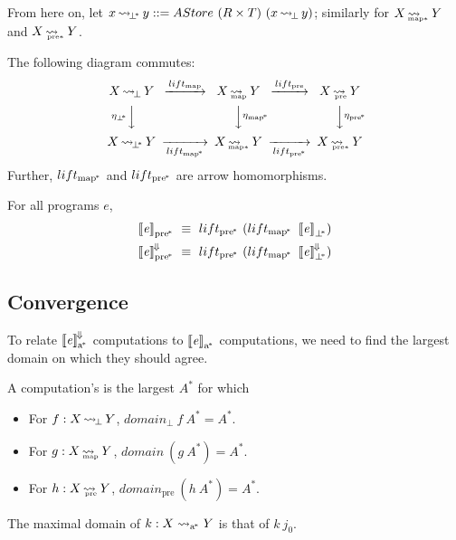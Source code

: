 \documentclass[preprint]{sigplanconf}
\newcommand{\arrow}{\rightsquigarrow}
\newcommand{\conv}{^{\mspace{-2mu}\Downarrow\mspace{-2mu}}}
\newcommand{\meaningofconv}[1]{\left\llbracket{#1}\right\rrbracket\conv}
\newcommand{\arrowlift}{\ensuremath{lift}}
\newcommand{\genc}{_\mathrm{a^{\mspace{-2mu}*}}}
\DeclareMathOperator{\botto}{\arrow_{\mspace{-3mu}\bot}}
\newcommand{\map}{_\mathrm{map}}
\DeclareMathOperator{\mapto}{\arrow_{\mspace{-21mu}\map}}
\newcommand{\liftmap}{\arrowlift\map}
\newcommand{\pre}{_\mathrm{pre}}
\DeclareMathOperator{\preto}{\arrow_{\mspace{-19mu}\pre}}
\newcommand{\liftpre}{\arrowlift\pre}
\newcommand{\pbot}{{\bot^{\mspace{-4mu}*}}}
\DeclareMathOperator{\pbotto}{\arrow_{\mspace{-3mu}\pbot}}
\newcommand{\pmap}{_\mathrm{map^{\mspace{-2mu}*}}}
\DeclareMathOperator{\pmapto}{\arrow_{\mspace{-22mu}_{\mathrm{map*}}}}
\newcommand{\liftpmap}{\arrowlift\pmap}
\newcommand{\ppre}{_\mathrm{pre^{\mspace{-2mu}*}}}
\DeclareMathOperator{\ppreto}{\arrow_{\mspace{-19mu}_{\mathrm{pre*}}}}
\newcommand{\liftppre}{\arrowlift\ppre}
\begin{document}
From here on, let $x \pbotto y ::= AStore~(R \times T)~(x \botto y)$; similarly for $X \pmapto Y$ and $X \ppreto Y$.

\begin{corollary}
The following diagram commutes:
\begin{equation}
\begin{CD}
X \botto Y   @>\liftmap>>   X \mapto Y   @>\liftpre>>   X \preto Y \\
@V{\eta_\pbot}VV             @VV{\eta\pmap}V              @VV{\eta\ppre}V\\
X \pbotto Y  @>>\liftpmap>  X \pmapto Y  @>>\liftppre>  X \ppreto Y
\end{CD}
\end{equation}
Further, $\liftpmap$ and $\liftppre$ are arrow homomorphisms.
\end{corollary}

\begin{corollary}
For all programs $\mathit{e}$,
\begin{equation}
\begin{aligned}
	\meaningof{\mathit{e}}\ppre &\ \equiv \ \liftppre~(\liftpmap~\meaningof{\mathit{e}}_\pbot)
\\
	\meaningofconv{\mathit{e}}\ppre &\ \equiv \ \liftppre~(\liftpmap~\meaningofconv{\mathit{e}}_\pbot)
\end{aligned}
\end{equation}
\end{corollary}

\subsection{Convergence}

To relate $\meaningofconv{\mathit{e}}\genc$ computations to $\meaningof{\mathit{e}}\genc$ computations, we need to find the largest domain on which they should agree.

\begin{definition}
A computation's  is the largest $A^*$ for which
\begin{itemize}
	\item For $f : X \botto Y$, $domain_\bot~f~A^* = A^*$.
	\item For $g : X \mapto Y$, $domain~(g~A^*) = A^*$.
	\item For $h : X \preto Y$, $domain\pre~(h~A^*) = A^*$.
\end{itemize}
The maximal domain of $k : X \arrow\genc Y$ is that of $k~j_0$.
\label{def:maximal-domain}
\end{definition}
\end{document}

